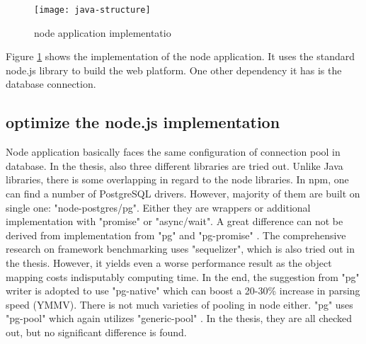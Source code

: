 \begin{figure}[h]
 	\centering
 	\texttt{[image: java-structure]}
 	\caption{node application implementatio}
 	\label{node-implementation}
 \end{figure}
 
Figure \ref{node-implementation} shows the implementation of the node application. It uses the standard node.js library to build the web platform. One other dependency it has is the database connection. 

\subsection{optimize the node.js implementation}
Node application basically faces the same configuration of connection pool in database. In the thesis, also three different libraries are tried out. Unlike Java libraries, there is some overlapping in regard to the node libraries. In npm, one can find a number of PostgreSQL drivers. However, majority of them are built on single one: "node-postgres/pg". Either they are wrappers or additional implementation with "promise" or "async/wait". A great difference can not be derived from implementation from "pg" and "pg-promise" . The comprehensive research on framework benchmarking uses "sequelizer", which is also tried out in the thesis. However, it yields even a worse performance result as the object mapping costs indisputably computing time. In the end, the suggestion from "pg" writer is adopted to use "pg-native" which can boost a 20-30\% increase in parsing speed (YMMV). There is not much varieties of pooling in node either. "pg" uses "pg-pool" which again utilizes "generic-pool" . In the thesis, they are all checked out, but no significant difference is found.  \\
     

